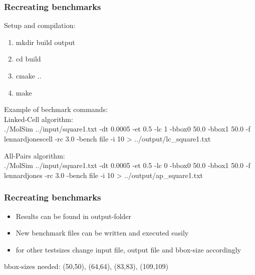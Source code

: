 \begin{frame}
	\frametitle{Recreating benchmarks}
	\large
	Setup and compilation:
	\vspace{-0.7cm}
	\begin{enumerate}
		\item mkdir build output
		\item cd build
		\item cmake ..
		\item make
	\end{enumerate}
	\vspace{-0.6cm}

	Example of bechmark commands:\\
	Linked-Cell algorithm:\\
	./MolSim ../input/square1.txt -dt 0.0005 -et 0.5 -lc 1 -bbox0 50.0 -bbox1 50.0 -f lennardjonescell -rc 3.0 -bench file -i 10 > ../output/lc\_square1.txt
	
	All-Pairs algorithm:\\
	./MolSim ../input/square1.txt -dt 0.0005 -et 0.5 -lc 0 -bbox0 50.0 -bbox1 50.0 -f lennardjones -rc 3.0 -bench file -i 10 > ../output/ap\_square1.txt\\
	
	\large


\end{frame}

\begin{frame}
	\frametitle{Recreating benchmarks}
	\vspace{2.5cm}
	\large
	\begin{itemize}
	\item Results can be found in output-folder
	\item New benchmark files can be written and executed easily
	\item for other testsizes change input file, output file and bbox-size accordingly
	\end{itemize}

	bbox-sizes needed: (50,50), (64,64), (83,83), (109,109)
	
\end{frame}




